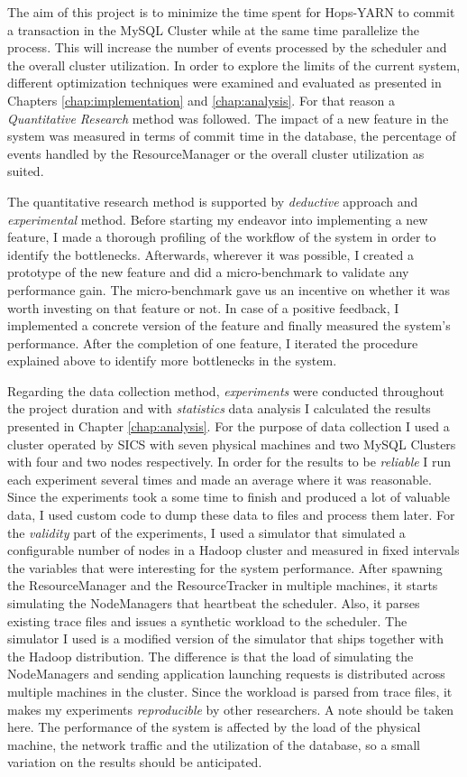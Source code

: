 The aim of this project is to minimize the time spent for Hops-YARN to commit
a transaction in the MySQL Cluster while at the same time parallelize the
process. This will increase the number of events processed by the
scheduler and the overall cluster utilization. In order to explore
the limits of the current system, different optimization techniques
were examined and evaluated as presented in Chapters
\ref{chap:implementation} and \ref{chap:analysis}. For that reason a
\emph{Quantitative Research} method was followed. The impact of a new
feature in the system was measured in terms of commit time in the
database, the percentage of events handled by the ResourceManager or
the overall cluster utilization as suited.

The quantitative research method is supported by \emph{deductive}
approach and \emph{experimental} method. Before starting my endeavor into
implementing a new feature, I made a thorough profiling of the
workflow of the system in order to identify the bottlenecks. Afterwards,
wherever it was possible, I created a prototype of the new
feature and did a micro-benchmark to validate any performance
gain. The micro-benchmark gave us an incentive on whether it was worth
investing on that feature or not. In case of a positive feedback, I
implemented a concrete version of the feature and finally measured the system's
performance. After the completion of one feature, I iterated the
procedure explained above to identify more bottlenecks in the system.

Regarding the data collection method, \emph{experiments} were
conducted throughout the project duration and with \emph{statistics}
data analysis I calculated the results presented in Chapter
\ref{chap:analysis}. For the purpose of data collection I used a
cluster operated by SICS with seven physical machines and two MySQL
Clusters with four and two nodes respectively. In order for the
results to be \emph{reliable} I run each experiment several times and
made an average where it was reasonable. Since the experiments took a
some time to finish and produced a lot of valuable data, I used custom
code to dump these data to files and process them later. For the
\emph{validity} part of the experiments, I used a simulator that
simulated a configurable number of nodes in a Hadoop cluster and
measured in fixed intervals the variables that were interesting for
the system performance. After spawning the ResourceManager and the
ResourceTracker in multiple machines, it starts simulating the
NodeManagers that heartbeat the scheduler. Also, it parses existing
trace files and issues a synthetic workload to the scheduler. The simulator I used is a
modified version of the simulator that ships together with the Hadoop
distribution. The difference is that the load of simulating the
NodeManagers and sending application launching requests is distributed across
multiple machines in the cluster. Since the workload is parsed from
trace files, it makes my experiments \emph{reproducible} by other
researchers. A note should be taken here. The performance of the system is affected
by the load of the physical machine, the network traffic and the
utilization of the database, so a small variation on the results
should be anticipated.
